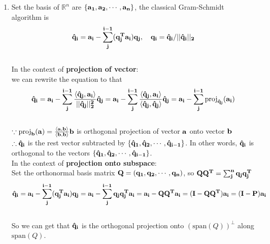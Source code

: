 \documentclass[english,onecolumn]{IEEEtran}
\begin{document}
\begin{enumerate}
    
    \item
    Set the basis of $\mathbb{R}^n$ are $\{\bf{a_1},\bf{a_2},\cdots,\bf{a_n} \}$, the classical Gram-Schmidt algorithm is $$
    \bf{\hat{q}_i = a_i} - \sum_j^{i-1} (\bf{q_j^T a_i})\bf{q_j}, \quad \bf{q_i = \hat{q}_i/ ||\hat{q}_i||_2 }
    $$\\
    In the context of \textbf{projection of vector}:\\
    we can rewrite the equation to that
    $$
    \bf{\hat{q}_i} = \bf{a_i} - \sum_j^{i-1} \frac{\langle \bf{\hat{q}_j}, \bf{a_i} \rangle}{||\bf{\hat{q}_j}||_2^2} \bf{\hat{q}_j} =  \bf{a_i} - \sum_j^{i-1} \frac{\langle \bf{\hat{q}_j}, \bf{a_i} \rangle}{\langle \bf{\hat{q}_j}, \bf{\hat{q}_j} \rangle} \bf{\hat{q}_j} = \bf{a_i} - \sum_j^{i-1} \text{proj}_{\bf{\hat{q}_j}}(\bf{a_i})
    $$\\
    $\because  \text{proj}_\mathbf{b}(\bf a)=\frac{\langle{\bf a},{\bf b}\rangle}{\langle{\bf b},{\bf b}\rangle}{\bf b} $ is orthogonal projection of vector ${\bf a}$ onto vector ${\bf b}$ \\
    $\therefore \bf{\hat{q}_i} $ is the rest vector subtracted by $\{ \bf{\bf{\hat{q}_1},\bf{\hat{q}_2},\cdots, \bf{\hat{q}_{i-1}}} \}$. In other words, $\bf{\hat{q}_i}$ is orthogonal to the vectors $\{ \bf{\bf{\hat{q}_1},\bf{\hat{q}_2},\cdots, \bf{\hat{q}_{i-1}}} \}$.\\
    In the context of \textbf{projection onto subspace}:\\
    Set the orthonormal basis matrix $\bf{Q} = (\bf{q_1},\bf{q_2},\cdots,\bf{q_n})$, so $\bf{Q Q^T} = \sum_{j}^{n} \bf{q_j} \bf{q_j^T} $ \\
    $$\bf{\hat{q}_i} = \bf{a_i} - \sum_{j}^{i-1} (\bf{q_j^T a_i})\bf{q_j} = \bf{a_i} - \sum_{j}^{i-1} \bf{q_j} \bf{q_j^T a_i} = \bf{a_i} -  \bf{Q Q^T a_i} = (\bf{I - Q Q^T}) \bf{a_i} = (\bf{I - P}) \bf{a_i} $$ \\
    So we can get that $\bf{\hat{q}_i}$ is the orthogonal projection onto $(\text{span}(Q))^{\perp}$ along $\text{span}(Q)$.\\
    

\end{enumerate}
\end{document}
